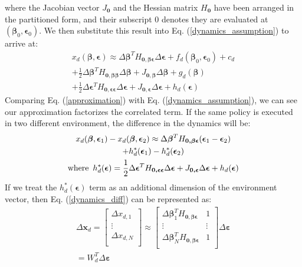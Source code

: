 \documentclass[journal]{IEEEtran}
\begin{document}
where the Jacobian vector $J_{\bm{0}}$ and the Hessian matrix $H_{\bm{0}}$ have been arranged in the partitioned form, and their subscript 0 denotes they are evaluated at $(\bm{\beta}_0, \bm{\epsilon}_0)$.
We then substitute this result into Eq. (\ref{dynamics_assumption}) to arrive at:
\begin{equation}
\begin{gathered}
x_d(\bm{\beta}, \bm{\epsilon}) \approx
\Delta \bm{\beta}^T H_{\bm{0, \beta \epsilon}} \Delta \bm{\epsilon}
+ f_d(\bm{\beta}_0, \bm{\epsilon}_0) + c_d
\\ + 
\frac{1}{2} \Delta \bm{\beta}^T H_{\bm{0, \beta \beta}} \Delta \bm{\beta} 
+ J_{\bm{0, \beta}} \Delta \bm{\beta}
+ g_d(\bm{\beta}) 
\\
+ \frac{1}{2} \Delta \bm{\epsilon}^T H_{\bm{0, \epsilon \epsilon}} \Delta \bm{\epsilon}
+ J_{\bm{0, \epsilon}} \Delta \bm{\epsilon}
+ h_d(\bm{\epsilon}) 
\end{gathered}
\label{approximation}
\end{equation}
%
Comparing Eq. (\ref{approximation}) with Eq. (\ref{dynamics_assumption}), we can see our approximation factorizes the correlated term. If the same policy is executed in two different environment, the difference in the dynamics will be:
\begin{equation}
\begin{gathered}
x_d(\bm{\beta}, \bm{\epsilon}_1) - 
x_d(\bm{\beta}, \bm{\epsilon}_2) \approx
\Delta \bm{\beta}^T H_{\bm{0, \beta \epsilon}} 
(\bm{\epsilon}_1 - \bm{\epsilon}_2)
\\
+ h^*_d(\bm{\epsilon}_1) - h^*_d(\bm{\epsilon}_2) 
\\
\text{where \,}
h^*_d(\bm{\epsilon}) = 
\frac{1}{2} \Delta \bm{\epsilon}^T H_{\bm{0, \epsilon \epsilon}} \Delta \bm{\epsilon}
+ J_{\bm{0, \epsilon}} \Delta \bm{\epsilon}
+ h_d(\bm{\epsilon}) 
\end{gathered}
\label{dynamics_diff}
\end{equation}
If we treat the $h^*_d(\bm{\epsilon})$ term as an additional dimension of the environment vector, then Eq. (\ref{dynamics_diff}) can be represented as:
\begin{equation}
\begin{gathered}
\Delta \bm{x}_d = 
\begin{bmatrix}
\Delta x_{d, 1} \\
\vdots \\
\Delta x_{d, N} \\
\end{bmatrix}
\approx
\begin{bmatrix}
\Delta \bm{\beta}_1^T H_{\bm{0, \beta \epsilon}} & 1 \\
\vdots & \vdots \\
\Delta \bm{\beta}_N^T H_{\bm{0, \beta \epsilon}} & 1 \\
\end{bmatrix}
\Delta \bm{\varepsilon} 
\\
= W_{d}^T \Delta \bm{\varepsilon}
\end{gathered}
\label{linear_form}
\end{equation}
\end{document}
